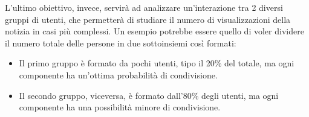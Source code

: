 L'ultimo obiettivo, invece, servirà ad analizzare un'interazione tra 2 diversi gruppi di utenti, che 
permetterà di studiare il numero di visualizzazioni della notizia in casi più complessi.
Un esempio potrebbe essere quello di voler dividere il numero totale delle persone in due sottoinsiemi così formati:
\begin{itemize}
 \item Il primo gruppo è formato da pochi utenti, tipo il 20\% del totale, ma ogni componente ha un'ottima probabilità di condivisione.
 \item Il secondo gruppo, viceversa, è formato dall'80\% degli utenti, ma ogni componente ha una possibilità minore di condivisione.
\end{itemize}





